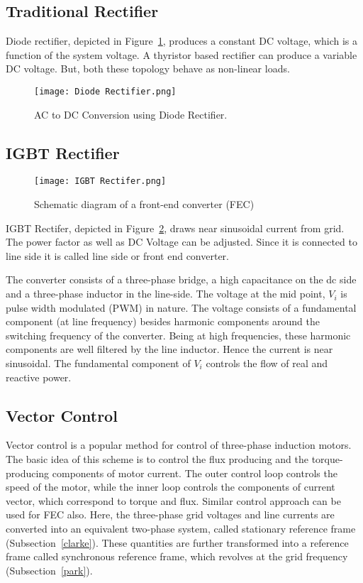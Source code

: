 \subsection{Traditional Rectifier}
Diode rectifier, depicted in Figure~\ref{fig:diode_rectifier}, produces a
constant DC voltage, which is a function of the system voltage. A thyristor
based rectifier can produce a variable DC voltage. But, both these topology
behave as non-linear loads.

\begin{figure}[h]
    \centering
    \texttt{[image: Diode Rectifier.png]}
    \caption{AC to DC Conversion using Diode Rectifier.}
    \label{fig:diode_rectifier}
\end{figure}

\subsection{IGBT Rectifier}
\begin{figure}[h]
    \centering
    \texttt{[image: IGBT Rectifer.png]}
    \caption{Schematic diagram of
        a front-end converter (FEC)}
    \label{fig:igbt_rectifier}
\end{figure}
\noindent
IGBT Rectifer, depicted in Figure~\ref{fig:igbt_rectifier}, draws near
sinusoidal current from grid. The power factor as well as DC Voltage can be
adjusted. Since it is connected to line side it is called line side or front
end converter.

The converter consists of a three-phase bridge, a high capacitance on the dc
side and a three-phase inductor in the line-side. The voltage at the mid point,
$V_i$ is pulse width modulated (PWM) in nature. The voltage consists of a
fundamental component (at line frequency) besides harmonic components around
the switching frequency of the converter. Being at high frequencies, these
harmonic components are well filtered by the line inductor. Hence the current
is near sinusoidal. The fundamental component of $V_i$ controls the flow of
real and reactive power.

\subsection{Vector Control}
Vector control is a popular method for control of three-phase induction motors.
The basic idea of this scheme is to control the flux producing and the
torque-producing components of motor current. The outer control loop controls
the speed of the motor, while the inner loop controls the components of current
vector, which correspond to torque and flux. Similar control approach can be
used for FEC also. Here, the three-phase grid voltages and line currents are
converted into an equivalent two-phase system, called stationary reference
frame (Subsection~\ref{clarke}). These quantities are further transformed into
a reference frame called synchronous reference frame, which revolves at the
grid frequency (Subsection~\ref{park}).

